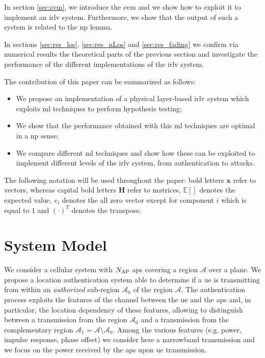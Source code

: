 \documentclass[draftcls,onecolumn,12pt]{IEEEtran}
\begin{document}
In section \ref{sec:svm}, we introduce the \ac{svm} and we show how to exploit it to implement an \ac{irlv} system. Furthermore, we show that the output of such a system is related to the \ac{np} lemma.

In sections \ref{sec:res_los}, \ref{sec:res_nLos} and \ref{sec:res_fading} we confirm via numerical results the theoretical parts of the previous section and investigate the performance of the different implementations of the \ac{irlv} system.

The contribution of this paper can be summarized as follows:
\begin{itemize}
    \item We propose an implementation of a physical layer-based \ac{irlv} system which exploits \ac{ml} techniques to perform hypothesis testing;
    \item We show that the performance obtained with this \ac{ml} techniques are optimal in a \ac{np} sense;
    \item We compare different \ac{ml} techniques and show how these can be exploited to implement different levels of the \ac{irlv} system, from authentication to attacks.
\end{itemize}

The following notation will be used throughout the paper: bold letters $\bm{x}$ refer to vectors, whereas capital bold letters $\bm{H}$ refer to matrices, $\mathbb{E}[]$ denotes the expected value, $e_i$ denotes the all zero vector except for component $i$ which is equal to $1$ and $(\cdot)^T$ denotes the transpose.

\section{System Model}
We consider a cellular system with $N_{\rm AP}$ \acp{ap} covering a region $\mathcal{A}$ over a plane. We propose a location authentication system able to determine if a \ac{ue} is transmitting from within an {\em authorized} sub-region $\mathcal{A}_0$ of the region $\mathcal{A}$. The authentication process exploits the features of the channel between the \ac{ue} and the \acp{ap} and, in particular, the location dependency of these features, allowing to distinguish between a transmission from the region $\mathcal{A_0}$ and a transmission from the complementary region $\mathcal{A}_1=\mathcal{A} \setminus \mathcal{A}_0$. Among the various features (e.g. power, impulse response, phase offset) we consider here a narrowband transmission and we focus on the power received by the \acp{ap} upon \ac{ue} transmission.
\end{document}

